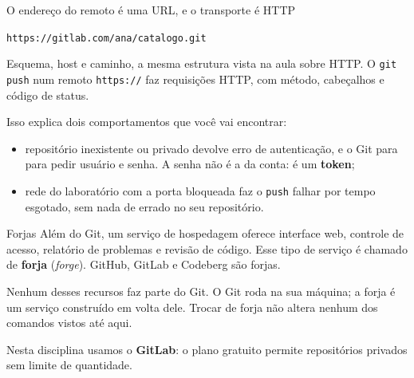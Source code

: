 \documentclass{beamer}
\begin{document}
\begin{frame}{O endereço do remoto é uma URL, e o transporte é HTTP}
  \begin{center}
    \texttt{https://gitlab.com/ana/catalogo.git}
  \end{center}

  \vspace{0.3cm}
  Esquema, host e caminho, a mesma estrutura vista na aula sobre HTTP. O
  \texttt{git push} num remoto \texttt{https://} faz requisições HTTP, com
  método, cabeçalhos e código de status.

  \vspace{0.4cm}
  Isso explica dois comportamentos que você vai encontrar:

  \begin{itemize}
    \item repositório inexistente ou privado devolve erro de autenticação, e o
          Git para para pedir usuário e senha. A senha não é a da conta: é um
          \textbf{token};
    \item rede do laboratório com a porta bloqueada faz o \texttt{push} falhar
          por tempo esgotado, sem nada de errado no seu repositório.
  \end{itemize}
\end{frame}

\begin{frame}{Forjas}
  Além do Git, um serviço de hospedagem oferece interface web, controle de
  acesso, relatório de problemas e revisão de código. Esse tipo de serviço é
  chamado de \textbf{forja} (\textit{forge}). GitHub, GitLab e Codeberg são
  forjas.

  \vspace{0.4cm}
  \begin{block}{}
    Nenhum desses recursos faz parte do Git. O Git roda na sua máquina; a forja
    é um serviço construído em volta dele. Trocar de forja não altera nenhum dos
    comandos vistos até aqui.
  \end{block}

  \vspace{0.4cm}
  Nesta disciplina usamos o \textbf{GitLab}: o plano gratuito permite
  repositórios privados sem limite de quantidade.
\end{frame}
\end{document}
